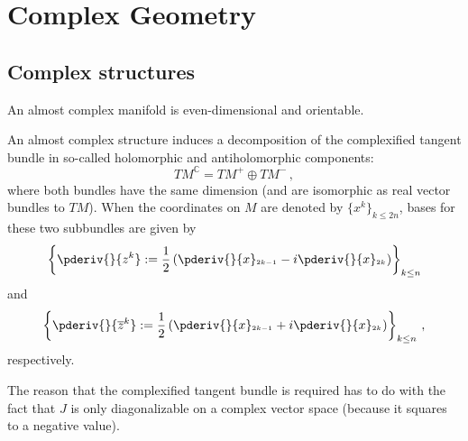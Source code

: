 \chapter{Complex Geometry}\label{chapter:complex_geometry}

    \minitoc

\section{Complex structures}


    \begin{property}
        An almost complex manifold is even-dimensional and orientable.
    \end{property}

    An almost complex structure induces a decomposition of the complexified tangent bundle in so-called holomorphic and antiholomorphic components:\[TM^{\mathbb{C}} = TM^+\oplus TM^-\,,\] where both bundles have the same dimension (and are isomorphic as real vector bundles to $TM$). When the coordinates on $M$ are denoted by $\{x^k\}_{k\leq 2n}$, bases for these two subbundles are given by
    \begin{gather}
        \left\{\pderiv{}{z^k} := \frac{1}{2}\left(\pderiv{}{x}_{^{2k-1}} - i\pderiv{}{x}_{^{2k}}\right)\right\}_{k\leq n}
    \end{gather}
    and
    \begin{gather}
        \left\{\pderiv{}{\overline{z}^k} := \frac{1}{2}\left(\pderiv{}{x}_{^{2k-1}} + i\pderiv{}{x}_{^{2k}}\right)\right\}_{k\leq n}\,,
    \end{gather}
    respectively.
    \begin{remark}
        The reason that the complexified tangent bundle is required has to do with the fact that $J$ is only diagonalizable on a complex vector space (because it squares to a negative value).
    \end{remark}

